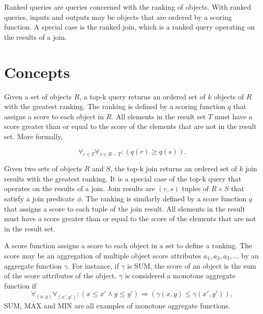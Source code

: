 Ranked queries are queries concerned with the ranking of objects. With ranked queries, inputs and outputs may be objects that are ordered by a scoring function. A special case is the ranked join, which is a ranked query operating on the results of a join.

\section{Concepts}

Given a set of objects \(R\), a top-k query returns an ordered set of \(k\) objects of \(R\) with the greatest ranking. The ranking is defined by a scoring function \(q\) that assigns a score to each object in \(R\). All elements in the result set \(T\) must have a score greater than or equal to the score of the elements that are not in the result set. More formally,

\[
  \forall_{r \in T}
  \forall_{s \in R - T} :
  \left(q(r) \geq q(s) \right).
\]

Given two sets of objects \(R\) and \(S\), the top-k join returns an ordered set of \(k\) join results with the greatest ranking. It is a special case of the top-k query that operates on the results of a join. Join results are \((r, s)\) tuples of \(R \times S\) that satisfy a join predicate \(\phi\). The ranking is similarly defined by a score function \(q\) that assigns a score to each tuple of the join result. All elements in the result must have a score greater than or equal to the score of the elements that are not in the result set.

A score function assigns a score to each object in a set to define a ranking. The score may be an aggregation of multiple object score attributes \(a_1, a_2, a_3, \dotsc\) by an aggregate function \(\gamma\). For instance, if \(\gamma\) is SUM, the score of an object is the sum of the score attributes of the object. \(\gamma\) is considered a monotone aggregate function if
\[
  \forall_{(x, y)} \forall_{(x', y')} :
  \left(
  x \leq x'
  \land
  y \leq y'
  \right)
  \Rightarrow
  \left(
  \gamma(x, y) \leq \gamma(x', y')
  \right),
\]
SUM, MAX and MIN are all examples of monotone aggregate functions.

